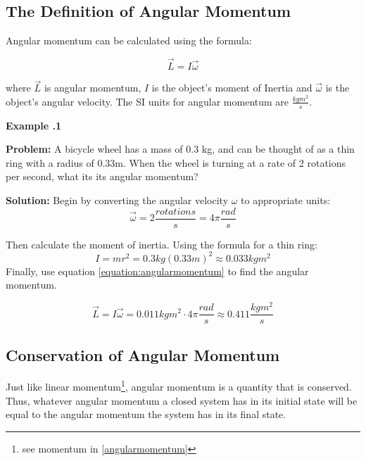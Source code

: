 	\subsection{The Definition of Angular Momentum}
	Angular momentum can be calculated using the formula: 
	 	\begin{mdframed}[backgroundcolor=orange!20!white]
		\begin{equation}
		\vec{L} = I \vec{\omega}
		\label{equation:angularmomentum}
				\end{equation}
	\end{mdframed}
where $\vec{L}$ is angular momentum, $I$ is the object's moment of Inertia and $\vec{\omega}$ is the object's angular velocity.  The SI units for angular momentum are  $\frac{kg m^2} {s} $.


\begin{mdframed}[backgroundcolor=blue!10!white]
	\begin{center}
		
		
		\textbf{Example \thesection.1}	
	\end{center}
	\vspace{0.1in}
	\textbf{Problem:} A bicycle wheel has a mass of 0.3 kg, and can be thought of as a thin ring with a radius of 0.33m. When the wheel is turning at a rate of 2 rotations per second, what its its angular momentum?
	\vspace{0.1in}
	
	\textbf{Solution:} 
	Begin by converting the angular velocity $\omega$ to appropriate units:
	\begin{equation*}
	\vec{\omega} = 2 \frac{rotations}{s} = 4\pi \frac{rad}{s}
	\end{equation*}
	
	Then calculate the moment of inertia.  Using the formula for a thin ring: 
	\begin{equation*}
	I  = mr^2 = 0.3 kg  (0.33m)^2 \approx 0.033 kg m^2
	\end{equation*}
	Finally, use equation \ref{equation:angularmomentum} to find the angular momentum. 
	
	\begin{equation*}
	\vec{L}  =  I \vec{\omega} = 0.011 kg m^2 \cdot 4\pi \frac{rad}{s} \approx \boxed{0.411 \frac{kg m^2}{s}}
	\end{equation*}
	
	
	
\end{mdframed}


	\subsection{Conservation of Angular Momentum}
 Just like linear momentum\footnote{see momentum in \cref{angularmomentum}}, angular momentum is a quantity that is conserved.  Thus, whatever angular momentum a closed system has in its initial state will be equal to the angular momentum the system has in its final state.  
 
